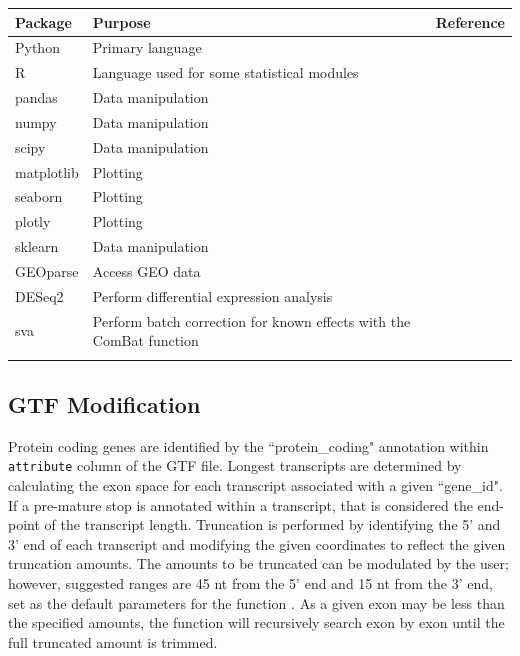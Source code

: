 \documentclass[11pt, a4paper, oneside]{article}
\begin{document}
\begin{tabular}{p{2.4cm}p{7.5cm}p{3cm}}
 \textbf{Package} & \textbf{Purpose} & \textbf{Reference} \\
 \hline
 Python & Primary language & \\
 \hline
 R & Language used for some statistical modules & \\
 \hline
 pandas & Data manipulation & \cite{pandas} \\
 \hline
 numpy & Data manipulation & \cite{numpy1, numpy2} \\
 \hline
 scipy & Data manipulation & \cite{scipy} \\
 \hline
 matplotlib & Plotting & \cite{matplotlib} \\
 \hline
 seaborn & Plotting & \cite{seaborn} \\
 \hline
 plotly & Plotting & \cite{plotly} \\
 \hline
 sklearn & Data manipulation & \cite{sklearn} \\
 \hline
 GEOparse & Access GEO data & \cite{geoparse} \\
 \hline
 DESeq2 & Perform differential expression analysis & \cite{deseq2} \\
 \hline
 sva & Perform batch correction for known effects with the ComBat function & \cite{sva} \\
 \label{Tab:software_plot}
 \end{tabular}
 \newline

\subsection{GTF Modification}
Protein coding genes are identified by the ``protein\_coding" annotation within \texttt{attribute} column of the GTF file.
Longest transcripts are determined by calculating the exon space for each transcript associated with a given ``gene\_id". If a pre-mature stop is annotated within a transcript, that is considered the end-point of the transcript length.
Truncation is performed by identifying the 5' and 3' end of each transcript and modifying the given coordinates to reflect the given truncation amounts. The amounts to be truncated can be modulated by the user; however, suggested ranges are 45 nt from the 5' end and 15 nt from the 3' end, set as the default parameters for the function \cite{ingolia_meth}. As a given exon may be less than the specified amounts, the function will recursively search exon by exon until the full truncated amount is trimmed.
\end{document}

